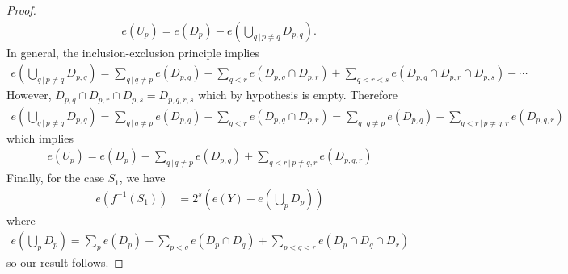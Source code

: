 \documentclass[12pt,twoside,]{amsart}
\theoremstyle{plain}
\theoremstyle{definition}
\begin{document}
\begin{proof}
\begin{align*}
&&
e(U_p) 
=
e(D_p)- e\left( \bigcup_{q\, | \, p \neq q }D_{p,q} \right).
\end{align*}
In general, 
the inclusion-exclusion principle implies
\begin{align*}
   e\left( \bigcup_{q\, | \, p \neq q }D_{p,q} \right) 
=
\sum_{ q \, | \, q \neq p} 
e(D_{p,q})- 
\sum_{q < r} 
e(D_{p,q} \cap D_{p,r})
+
\sum_{q < r < s} 
e(D_{p,q} \cap D_{p,r} \cap D_{p,s}
) - \cdots
\end{align*}
However, $D_{p,q} \cap D_{p,r} \cap D_{p,s} =  D_{p,q,r,s}$ which by hypothesis is empty. Therefore
\begin{align*}
   e\left( \bigcup_{q\, | \, p \neq q }
   D_{p,q} \right) 
=
\sum_{ q \, | \, q \neq p} 
e(D_{p,q})- 
\sum_{q < r} 
e(D_{p,q} \cap D_{p,r})
=
\sum_{ q \, | \, q \neq p} 
e(D_{p,q})- 
\sum_{q < r \, |\,  p \neq q,r} 
e(D_{p,q,r})
\end{align*}
which implies
\begin{align*}
e(U_p) 
=
e(D_p) - 
\sum_{ q \, | \, q \neq p} e(D_{p,q}) + 
\sum_{q < r \,|\,  p \neq q,r} 
e(D_{p,q,r})
\end{align*}
Finally, for the case $S_1$, we have
\begin{align*}
e(f^{-1}(S_1))
&= 
2^s\left( 
e\left(Y\right) - 
e\left( \bigcup_p D_p \right)   
\right)
\end{align*}
where
\begin{align*}
 e\left( \bigcup_p D_p \right)  
 =
\sum_p e\left( D_p \right) - 
\sum_{p < q} e\left( D_p \cap D_q \right) +
\sum_{p < q < r} e\left( D_p \cap D_q  \cap D_r \right)
\end{align*}  
so our result follows.
\end{proof}
\end{document}
